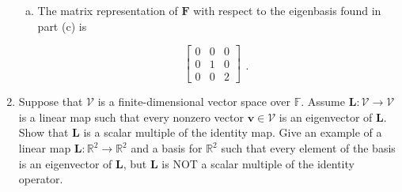 \documentclass[12pt]{amsart}
\newcommand{\1}{\mathbbm{1}}
\numberwithin{equation}{section}
\numberwithin{Theorem}{section}
\theoremstyle{plain} %
\theoremstyle{definition}
\theoremstyle{remark}
\begin{document}
\begin{enumerate}[1.]
\begin{enumerate}[(a)]
	\item 
	The matrix representation of $\mathbf{F}$ with respect to the eigenbasis found in part (c) is
	\begin{comment}
	\begin{align*}
		\mathbf{F}(a\mathbf{v}_0+b\mathbf{v}_1+c\mathbf{v}_2)
		&= \mathbf{F}(a+b+c +bx+2cx +cx^2) \\
		&= \mathbf{F}((a+b+c) +(b+2c)x +(c)x^2) \\
		&= (x+1)(b+2c +2cx) \\
		&= b+2c +2cx + (b+2c)x +2cx^2 \\
		&= a(0+0x+0x^2) + b(1+x+0x^2) + 2c(1+2x+x^2) \\
		&= a\mathbf{v}_0 + b\mathbf{v}_1 + 2c\mathbf{v}_2 \\
		&= \begin{bmatrix}	0 \\ b \\ 2c \end{bmatrix}
		\Rightarrow
	\end{align*}
	\end{comment}
	\[\begin{bmatrix}
		0 & 0 & 0 \\
		0 & 1 & 0 \\
		0 & 0 & 2
	\end{bmatrix}
	\begin{matrix}  \\  \\ . \end{matrix}\]

\end{enumerate}
\clearpage

\item Suppose that \(\mathcal{V}\) is a finite-dimensional vector space over \(\mathbb{F}\). Assume \(\mathbf{L}:\mathcal{V}\to\mathcal{V}\) is a linear map such that every nonzero vector \(\mathbf{v}\in\mathcal{V}\) is an eigenvector of \(\mathbf{L}\). Show that \(\mathbf{L}\) is a scalar multiple of the identity map. Give an example of a linear map \(\mathbf{L}:\mathbb{R}^{2}\to\mathbb{R}^{2}\) and a basis for \(\mathbb{R}^{2}\) such that every element of the basis is an eigenvector of \(\mathbf{L}\), but \(\mathbf{L}\) is NOT a scalar multiple of the identity operator.


\end{enumerate}
\end{document}

